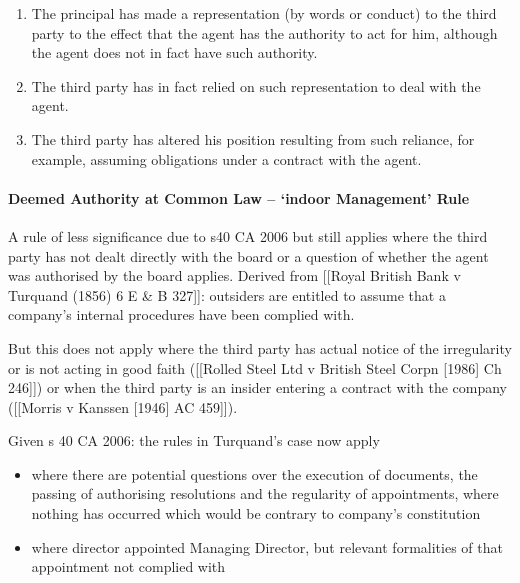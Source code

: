 \documentclass[
]{article}
\providecommand{\tightlist}{%
  \setlength{\itemsep}{0pt}\setlength{\parskip}{0pt}}
\begin{document}
\begin{enumerate}
\def\labelenumi{\arabic{enumi}.}
\tightlist
\item
  The principal has made a representation (by words or conduct) to the
  third party to the effect that the agent has the authority to act for
  him, although the agent does not in fact have such authority.
\item
  The third party has in fact relied on such representation to deal with
  the agent.
\item
  The third party has altered his position resulting from such reliance,
  for example, assuming obligations under a contract with the agent.
\end{enumerate}

\hypertarget{deemed-authority-at-common-law-indoor-management-rule}{%
\paragraph{Deemed Authority at Common Law -- `indoor Management'
Rule}\label{deemed-authority-at-common-law-indoor-management-rule}}

A rule of less significance due to s40 CA 2006 but still applies where
the third party has not dealt directly with the board or a question of
whether the agent was authorised by the board applies. Derived from
{[}{[}Royal British Bank v Turquand (1856) 6 E \& B 327{]}{]}: outsiders
are entitled to assume that a company's internal procedures have been
complied with.

But this does not apply where the third party has actual notice of the
irregularity or is not acting in good faith ({[}{[}Rolled Steel Ltd v
British Steel Corpn {[}1986{]} Ch 246{]}{]}) or when the third party is
an insider entering a contract with the company ({[}{[}Morris v Kanssen
{[}1946{]} AC 459{]}{]}).

Given s 40 CA 2006: the rules in Turquand's case now apply

\begin{itemize}
\tightlist
\item
  where there are potential questions over the execution of documents,
  the passing of authorising resolutions and the regularity of
  appointments, where nothing has occurred which would be contrary to
  company's constitution
\item
  where director appointed Managing Director, but relevant formalities
  of that appointment not complied with
\end{itemize}
\end{document}
